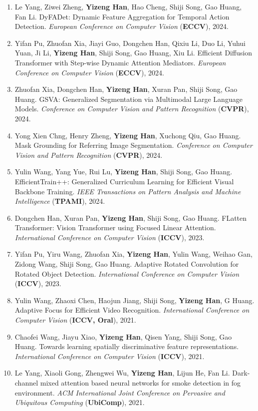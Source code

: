 \documentclass[10.5pt]{article}
\makeatletter
\newlength{\bibhang}
\newlength{\bibsep}
 {\@listi \global\bibsep\itemsep \global\advance\bibsep by\parsep}
\newenvironment{bibsection}%
        {\begin{enumerate}{%
       \setlength{\leftmargin}{-2em}%
       \setlength{\itemindent}{-2em}%
       \setlength{\itemsep}{\bibsep}%
        \setlength{\partopsep}{0pt}%
        \setlength{\topsep}{0pt}}}
        {\end{enumerate}\vspace{-.6\baselineskip}}
\makeatother
\begin{document}
\begin{sloppypar}
\begin{bibsection}
        \item Le Yang, Ziwei Zheng, \textbf{Yizeng Han}, Hao Cheng, Shiji Song, Gao Huang, Fan Li. DyFADet: Dynamic Feature Aggregation for Temporal Action Detection. \emph{European Conference on Computer Vision} (\textbf{ECCV}), 2024.
        \item Yifan Pu, Zhuofan Xia, Jiayi Guo, Dongchen Han, Qixiu Li, Duo Li, Yuhui Yuan, Ji Li, \textbf{Yizeng Han}, Shiji Song, Gao Huang, Xiu Li. Efficient Diffusion Transformer with Step-wise Dynamic Attention Mediators. \emph{European Conference on Computer Vision} (\textbf{ECCV}), 2024.
        \item Zhuofan Xia, Dongchen Han, \textbf{Yizeng Han}, Xuran Pan, Shiji Song, Gao Huang. GSVA: Generalized Segmentation via Multimodal Large Language Models. \emph{Conference on Computer Vision and Pattern Recognition} (\textbf{CVPR}), 2024.
        \item Yong Xien Chng, Henry Zheng, \textbf{Yizeng Han}, Xuchong Qiu, Gao Huang. Mask Grounding for Referring Image Segmentation. \emph{Conference on Computer Vision and Pattern Recognition} (\textbf{CVPR}), 2024.
        \item Yulin Wang, Yang Yue, Rui Lu, \textbf{Yizeng Han}, Shiji Song,  Gao Huang. EfficientTrain++: Generalized Curriculum Learning for Efficient Visual Backbone Training. \emph{IEEE Transactions on Pattern Analysis and Machine Intelligence} (\textbf{TPAMI}), 2024.
        \item Dongchen Han, Xuran Pan, \textbf{Yizeng Han}, Shiji Song, Gao Huang. FLatten Transformer: Vision Transformer using Focused Linear Attention. \emph{International Conference on Computer Vision} (\textbf{ICCV}), 2023.
        \item Yifan Pu, Yiru Wang, Zhuofan Xia, \textbf{Yizeng Han}, Yulin Wang, Weihao Gan, Zidong Wang, Shiji Song, Gao Huang. Adaptive Rotated Convolution for Rotated Object Detection. \emph{International Conference on Computer Vision} (\textbf{ICCV}), 2023.
        \item Yulin Wang, Zhaoxi Chen, Haojun Jiang, Shiji Song, \textbf{Yizeng Han}, G Huang. Adaptive Focus for Efficient Video Recognition. \emph{International Conference on Computer Vision} (\textbf{ICCV, Oral}), 2021.
        \item Chaofei Wang, Jiayu Xiao, \textbf{Yizeng Han}, Qisen Yang, Shiji Song, Gao Huang. Towards learning spatially discriminative feature representations. \emph{International Conference on Computer Vision} (\textbf{ICCV}), 2021.
        \item Le Yang, Xiaoli Gong, Zhengwei Wu, \textbf{Yizeng Han}, Lijun He, Fan Li. Dark-channel mixed attention based neural networks for smoke detection in fog environment. \emph{ACM International Joint Conference on Pervasive and Ubiquitous Computing} (\textbf{UbiComp}), 2021.

\end{bibsection}
\end{sloppypar}
\end{document}
